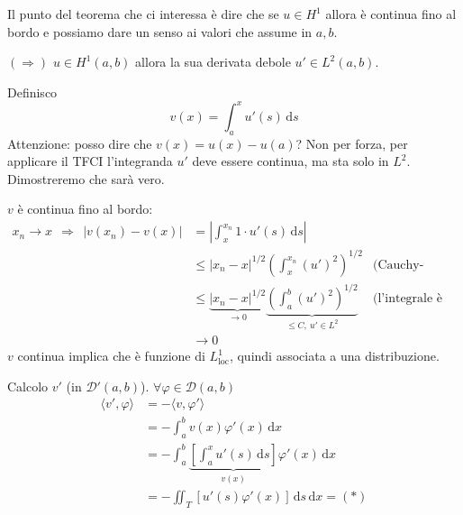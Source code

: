 \documentclass[10pt,a4paper,twoside,openright]{book}
\newcommand{\de}{\,\mathrm d}
\newcommand{\dx}{\de x}
\newcommand{\ds}{\de s}
\begin{document}
Il punto del teorema che ci interessa è dire che se $u\in H^{1}$ allora è continua fino al bordo e possiamo dare un senso ai valori che assume in $a,b$.
\begin{dimostrazione}
	$(\Rightarrow)$ $u\in H^{1}(a,b)$ allora la sua derivata debole $u'\in L^{2}(a,b)$.
	
	Definisco
	\begin{equation*}
		v(x) =\int ^{x}_{a} u'(s) \ds
	\end{equation*}
	Attenzione: posso dire che $v(x) =u(x) -u(a)$? Non per forza, per applicare il TFCI l'integranda $u'$ deve essere continua, ma sta solo in $L^{2}$. Dimostreremo che sarà vero.
	
	$v$ è continua fino al bordo:
	\begin{align*}
		x_{n}\rightarrow x\ \ \Rightarrow \ \ | v(x_{n}) -v(x)| & =\left| \int ^{x_{n}}_{x} 1\cdot u'(s) \ds\right|                                                                                                 &                                  \\
		                                                          & \leqslant | x_{n} -x| ^{1/2}\left(\int ^{x_{n}}_{x}(u')^{2}\right)^{1/2}                                                                  & \text{(Cauchy-Schwarz)} \\
		                                                          & \leqslant \underbrace{| x_{n} -x| ^{1/2}}_{\rightarrow 0}\underbrace{\left(\int ^{b}_{a}(u')^{2}\right)^{1/2}}_{\leqslant C,\ u'\in L^{2}} & \text{(l'integrale è positivo)} \\
		                                                          & \rightarrow 0                                                                                                                              &                                  
	\end{align*}
	$v$ continua implica che è funzione di $L^{1}_{\mathrm{loc}}$, quindi associata a una distribuzione.
	
	Calcolo $v'$ (in $\mathcal{D} '(a,b)$). $\forall \varphi \in \mathcal{D}(a,b)$
	\begin{align*}
		\langle v',\varphi \rangle & =-\langle v,\varphi '\rangle \\
								   & =-\int ^{b}_{a} v(x) \varphi '(x) \dx\\
								   & =-\int ^{b}_{a}\underbrace{\left[\int ^{x}_{a} u'(s) \ds\right]}_{v(x)} \varphi '(x) \dx \\
		                           & =-\iint _{T}[ u'(s) \varphi '(x)] \ds\dx=(*)                                                                                           
	\end{align*}



\end{dimostrazione}
\end{document}

